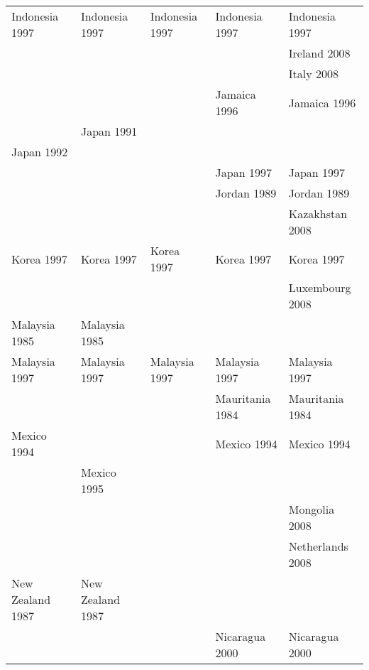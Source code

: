 \begin{table}[ht]
{\begin{tabular}{lllll}
  Indonesia 1997\cellcolor[gray]{0.916666666666667} & Indonesia 1997\cellcolor[gray]{0.916666666666667} & Indonesia 1997\cellcolor[gray]{0.916666666666667} & Indonesia 1997\cellcolor[gray]{0.916666666666667} & Indonesia 1997\cellcolor[gray]{0.916666666666667} \\ 
   &  &  &  & Ireland 2008\cellcolor[gray]{0.5} \\ 
   &  &  &  & Italy 2008\cellcolor[gray]{0.5} \\ 
   &  &  & Jamaica 1996\cellcolor[gray]{0.5} & Jamaica 1996\cellcolor[gray]{0.5} \\ 
   & Japan 1991\cellcolor[gray]{0.5} &  &  &  \\ 
  Japan 1992\cellcolor[gray]{0.5} &  &  &  &  \\ 
   &  &  & Japan 1997\cellcolor[gray]{0.5} & Japan 1997\cellcolor[gray]{0.5} \\ 
   &  &  & Jordan 1989\cellcolor[gray]{1} & Jordan 1989\cellcolor[gray]{1} \\ 
   &  &  &  & Kazakhstan 2008\cellcolor[gray]{1} \\ 
  Korea 1997\cellcolor[gray]{0.5} & Korea 1997\cellcolor[gray]{0.5} & Korea 1997\cellcolor[gray]{0.5} & Korea 1997\cellcolor[gray]{0.5} & Korea 1997\cellcolor[gray]{0.5} \\ 
   &  &  &  & Luxembourg 2008\cellcolor[gray]{0.5} \\ 
  Malaysia 1985\cellcolor[gray]{0.5} & Malaysia 1985\cellcolor[gray]{0.5} &  &  &  \\ 
  Malaysia 1997\cellcolor[gray]{0.5} & Malaysia 1997\cellcolor[gray]{0.5} & Malaysia 1997\cellcolor[gray]{0.5} & Malaysia 1997\cellcolor[gray]{0.5} & Malaysia 1997\cellcolor[gray]{0.5} \\ 
   &  &  & Mauritania 1984\cellcolor[gray]{1} & Mauritania 1984\cellcolor[gray]{1} \\ 
  Mexico 1994\cellcolor[gray]{0.5} &  &  & Mexico 1994\cellcolor[gray]{0.5} & Mexico 1994\cellcolor[gray]{0.5} \\ 
   & Mexico 1995\cellcolor[gray]{0.5} &  &  &  \\ 
   &  &  &  & Mongolia 2008\cellcolor[gray]{0.5} \\ 
   &  &  &  & Netherlands 2008\cellcolor[gray]{0.5} \\ 
  New Zealand 1987\cellcolor[gray]{0.5} & New Zealand 1987\cellcolor[gray]{0.5} &  &  &  \\ 
   &  &  & Nicaragua 2000\cellcolor[gray]{0.5} & Nicaragua 2000\cellcolor[gray]{0.5} \\ 

\end{tabular}}
\end{table}
